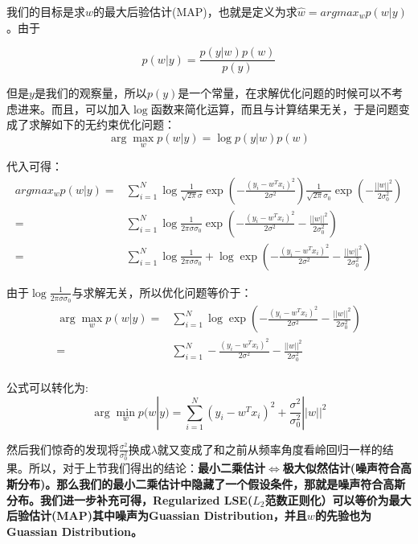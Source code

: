 \documentclass[a4paper]{article}
\begin{document}
我们的目标是求$w$的最大后验估计(MAP)，也就是定义为求$\hat{w} = argmax_w p(w|y)$。由于

\begin{equation}
    p(w|y) = \frac{p(y|w)p(w)}{p(y)}
\end{equation}

但是$y$是我们的观察量，所以$p(y)$是一个常量，在求解优化问题的时候可以不考虑进来。而且，可以加入$\log$函数来简化运算，而且与计算结果无关，于是问题变成了求解如下的无约束优化问题：
\begin{equation}
    \arg\max_w p(w|y)= \log p(y|w)p(w)
\end{equation}

代入可得：
\begin{align}
    argmax_w p(w|y) = & \sum_{i=1}^{N}\log \frac{1}{\sqrt{2\pi}\sigma}\exp\left( -\frac{(y_i - w^Tx_i)^2}{2\sigma^2}  \right) \frac{1}{\sqrt{2\pi}\sigma_0}\exp\left( -\frac{||w||^2}{2\sigma_0^2} \right) \\
    = & \sum_{i=1}^{N}\log \frac{1}{2\pi\sigma\sigma_0}\exp\left( -\frac{(y_i - w^Tx_i)^2}{2\sigma^2}  -\frac{||w||^2}{2\sigma_0^2} \right) \\
    = & \sum_{i=1}^{N} \log \frac{1}{2\pi\sigma\sigma_0} + \log \exp\left( -\frac{(y_i - w^Tx_i)^2}{2\sigma^2}  -\frac{||w||^2}{2\sigma_0^2} \right) 
\end{align}

由于$\log \frac{1}{2\pi\sigma\sigma_0}$与求解无关，所以优化问题等价于：
\begin{align}
    \arg\max_w p(w|y) 
    = & \sum_{i=1}^{N}  \log \exp\left( -\frac{(y_i - w^Tx_i)^2}{2\sigma^2}  -\frac{||w||^2}{2\sigma_0^2} \right) \\
    = & \sum_{i=1}^{N}  -\frac{(y_i - w^Tx_i)^2}{2\sigma^2}  -\frac{||w||^2}{2\sigma_0^2} \\
\end{align}

公式可以转化为:
\begin{equation}
    \arg\min_w p(w|y) =  \sum_{i=1}^{N} (y_i - w^Tx_i)^2  + \frac{\sigma^2}{\sigma_0^2}||w||^2
\end{equation}

然后我们惊奇的发现将$\frac{\sigma^2}{\sigma_0^2}$换成$\lambda$就又变成了和之前从频率角度看岭回归一样的结果。所以，对于上节我们得出的结论：\textbf{最小二乘估计$\Longleftrightarrow$极大似然估计(噪声符合高斯分布)。那么我们的最小二乘估计中隐藏了一个假设条件，那就是噪声符合高斯分布。我们进一步补充可得，Regularized LSE($L_2$范数正则化）可以等价为最大后验估计(MAP)其中噪声为Guassian Distribution，并且$w$的先验也为Guassian Distribution。}
\end{document}
